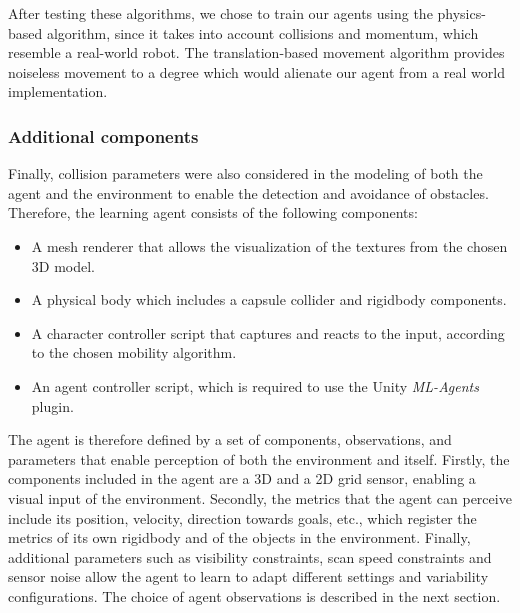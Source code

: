 After testing these algorithms, we chose to train our agents using the physics-based algorithm, since it takes into account collisions and momentum, which resemble a real-world robot.
The translation-based movement algorithm  provides noiseless movement to a degree which would alienate our agent from a real world implementation.




\subsubsection{Additional components} 
Finally, collision parameters were also considered in the modeling of both the agent and the environment to enable the detection and avoidance of obstacles.
Therefore, the learning agent consists of the following components:
\begin{itemize}
    \item A mesh renderer that allows the visualization of the textures from the chosen 3D model.
    \item A physical body which includes a capsule collider and rigidbody components.
    \item A character controller script that captures and reacts to the input, according to the chosen mobility algorithm.
    \item An agent controller script, which is required to use the Unity \textit{ML-Agents} plugin.
\end{itemize}

The agent is therefore defined by a set of components, observations, and parameters that enable perception of both the environment and itself. 
Firstly, the components included in the agent are a 3D and a 2D grid sensor, enabling a visual input of the environment. 
Secondly, the metrics that the agent can perceive include its position, velocity, direction towards goals, etc., which register the metrics of its own rigidbody and of the objects in the environment. Finally, additional parameters such as visibility constraints, scan speed constraints and sensor noise allow the agent to learn to adapt different settings and variability configurations.
The choice of agent observations is described in the next section.

